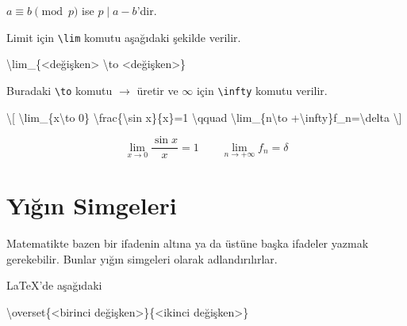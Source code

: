 \documentclass[
  10pt,
]{scrbook}
\newenvironment{Shaded}{\begin{snugshade}}{\end{snugshade}}
\newcommand{\FunctionTok}[1]{\textcolor[rgb]{0.00,0.00,0.00}{#1}}
\newcommand{\NormalTok}[1]{#1}
\newcommand{\SpecialCharTok}[1]{\textcolor[rgb]{0.00,0.00,0.00}{#1}}
\newcommand{\SpecialStringTok}[1]{\textcolor[rgb]{0.31,0.60,0.02}{#1}}
\theoremstyle{definition}
\theoremstyle{definition}
\theoremstyle{definition}
\theoremstyle{definition}
\theoremstyle{remark}
\begin{document}
\(a\equiv b\pmod p\) ise \(p\mid a-b\)'dir.

Limit için \texttt{\textbackslash{}lim} komutu aşağıdaki şekilde verilir.

\begin{Shaded}
\begin{Highlighting}[]
\FunctionTok{\textbackslash{}lim}\NormalTok{\_\{\textless{}değişken\textgreater{} }\FunctionTok{\textbackslash{}to}\NormalTok{ \textless{}değişken\textgreater{}\}}
\end{Highlighting}
\end{Shaded}

Buradaki \texttt{\textbackslash{}to} komutu \(\to\) üretir ve \(\infty\) için \texttt{\textbackslash{}infty} komutu verilir.

\begin{Shaded}
\begin{Highlighting}[]
\SpecialStringTok{\textbackslash{}[}
\SpecialCharTok{\textbackslash{}lim}\SpecialStringTok{\_\{x}\SpecialCharTok{\textbackslash{}to}\SpecialStringTok{ 0\}}
\SpecialCharTok{\textbackslash{}frac}\SpecialStringTok{\{}\SpecialCharTok{\textbackslash{}sin}\SpecialStringTok{ x\}\{x\}=1 }\SpecialCharTok{\textbackslash{}qquad}
\SpecialCharTok{\textbackslash{}lim}\SpecialStringTok{\_\{n}\SpecialCharTok{\textbackslash{}to}\SpecialStringTok{ +}\SpecialCharTok{\textbackslash{}infty}\SpecialStringTok{\}f\_n=}\SpecialCharTok{\textbackslash{}delta}
\SpecialStringTok{\textbackslash{}]}
\end{Highlighting}
\end{Shaded}

\[
\lim_{x\to 0}
\frac{\sin x}{x}=1 \qquad
\lim_{n\to +\infty}f_n=\delta
\]

\hypertarget{yux131ux11fux131n-simgeleri}{%
\section{Yığın Simgeleri}\label{yux131ux11fux131n-simgeleri}}

Matematikte bazen bir ifadenin altına ya da üstüne başka ifadeler yazmak gerekebilir. Bunlar yığın simgeleri olarak adlandırılırlar.

LaTeX'de aşağıdaki

\begin{Shaded}
\begin{Highlighting}[]
\FunctionTok{\textbackslash{}overset}\NormalTok{\{\textless{}birinci değişken\textgreater{}\}\{\textless{}ikinci değişken\textgreater{}\}}
\end{Highlighting}
\end{Shaded}
\end{document}
